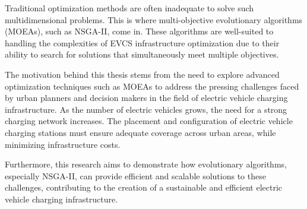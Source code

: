 Traditional optimization methods are often inadequate to solve such multidimensional problems. This is where multi-objective evolutionary algorithms (MOEAs), such as NSGA-II, come in. These algorithms are well-suited to handling the complexities of EVCS infrastructure optimization due to their ability to search for solutions that simultaneously meet multiple objectives.

The motivation behind this thesis stems from the need to explore advanced optimization techniques such as MOEAs to address the pressing challenges faced by urban planners and decision makers in the field of electric vehicle charging infrastructure. As the number of electric vehicles grows, the need for a strong charging network increases. The placement and configuration of electric vehicle charging stations must ensure adequate coverage across urban areas, while minimizing infrastructure costs. 

Furthermore, this research aims to demonstrate how evolutionary algorithms, especially NSGA-II, can provide efficient and scalable solutions to these challenges, contributing to the creation of a sustainable and efficient electric vehicle charging infrastructure.


